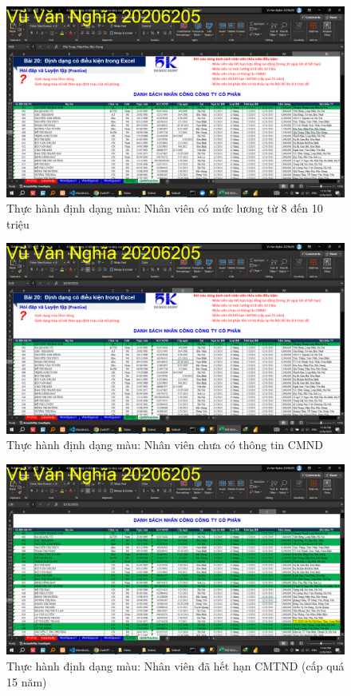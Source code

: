 \documentclass{article}
\begin{document}
\begin{figure}[h]
\centering
\includegraphics[scale = 0.15]{Video8/ThucHanh/3.png}
\caption{Thực hành định dạng màu: Nhân viên có mức lương từ 8 đến 10 triệu}
\end{figure}
\begin{figure}[h]
\centering
\includegraphics[scale = 0.15]{Video8/ThucHanh/4.png}
\caption{Thực hành định dạng màu: Nhân viên chưa có thông tin CMND}
\end{figure}
\begin{figure}[h]
\centering
\includegraphics[scale = 0.15]{Video8/ThucHanh/5.png}
\caption{Thực hành định dạng màu: Nhân viên đã hết hạn CMTND (cấp quá 15 năm)}
\end{figure}
\end{document}
